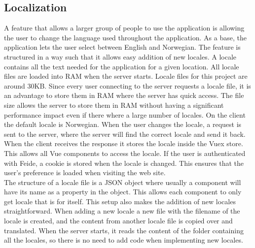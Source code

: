 \subsection{Localization}
A feature that allows a larger group of people to use the application is allowing the user to change the language used throughout the application. As a base, the application lets the user select between English and Norwegian. The feature is structured in a way such that it allows easy addition of new locales. A locale contains all the text needed for the application for a given location. All locale files are loaded into RAM when the server starts. Locale files for this project are around 30KB. Since every user connecting to the server requests a locale file, it is an advantage to store them in RAM where the server has quick access. The file size allows the server to store them in RAM without having a significant performance impact even if there where a large number of locales. On the client the default locale is Norwegian. When the user changes the locale, a request is sent to the server, where the server will find the correct locale and send it back. When the client receives the response it stores the locale inside the Vuex store. This allows all Vue components to access the locale. If the user is authenticated with Feide, a cookie is stored when the locale is changed. This ensures that the user's preference is loaded when visiting the web site.
\\[11pt]
The structure of a locale file is a JSON object where usually a component will have its name as a property in the object. This allows each component to only get locale that is for itself. This setup also makes the addition of new locales straightforward. When adding a new locale a new file with the filename of the locale is created, and the content from another locale file is copied over and translated. When the server starts, it reads the content of the folder containing all the locales, so there is no need to add code when implementing new locales.